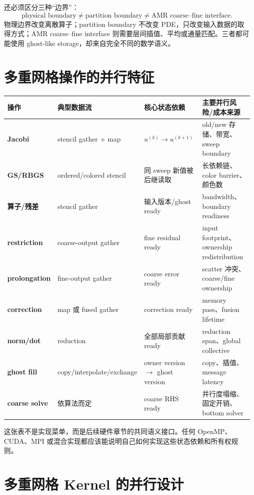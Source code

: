 还必须区分三种“边界”：
\begin{equation}
\boxed{
\text{physical boundary}
\neq
\text{partition boundary}
\neq
\text{AMR coarse--fine interface}.
}
\label{eq:mg-boundary-classes}
\end{equation}
物理边界改变离散算子；partition boundary 不改变 PDE，只改变输入数据的取得方式；AMR coarse--fine interface 则需要层间插值、平均或通量匹配。三者都可能使用 ghost-like storage，却来自完全不同的数学语义。

\section{多重网格操作的并行特征}

\begin{center}
\small
\begin{tabularx}{0.99\textwidth}{>{\bfseries}p{2.0cm}p{2.35cm}p{2.65cm}X}
\toprule
操作 & 典型数据流 & 核心状态依赖 & 主要并行风险/成本来源\\
\midrule
Jacobi & stencil gather + map & $u^{(k)}\rightarrow u^{(k+1)}$ & old/new 存储、带宽、sweep boundary\\
GS/RBGS & ordered/colored stencil & 同 sweep 新值被后继读取 & 长依赖链、color barrier、颜色数\\
算子/残差 & stencil gather & 输入版本/ghost ready & bandwidth、boundary readiness\\
restriction & coarse-output gather & fine residual ready & input footprint、ownership redistribution\\
prolongation & fine-output gather & coarse error ready & scatter 冲突、coarse/fine ownership\\
correction & map 或 fused gather & correction ready & memory pass、fusion lifetime\\
norm/dot & reduction & 全部局部贡献 ready & reduction span、global collective\\
ghost fill & copy/interpolate/exchange & owner version $\rightarrow$ ghost version & copy、插值、message latency\\
coarse solve & 依算法而定 & coarse RHS ready & 并行度塌缩、固定开销、bottom solver\\
\bottomrule
\end{tabularx}
\end{center}

这张表不是实现菜单，而是后续硬件章节的共同语义接口。任何 OpenMP、CUDA、MPI 或混合实现都应该能说明自己如何实现这些状态依赖和所有权规则。

\section{多重网格 Kernel 的并行设计}

